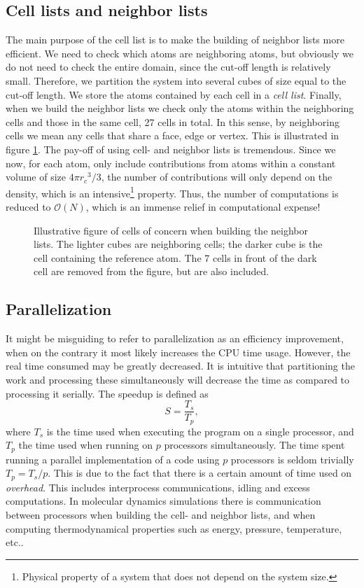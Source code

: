 \documentclass[twoside,english]{uiofysmaster}
\begin{document}
\subsection{Cell lists and neighbor lists}
The main purpose of the cell list is to make the building of neighbor lists more efficient. 
We need to check which atoms are neighboring atoms, but obviously we do not need to check the entire domain, since the cut-off length is relatively small. 
Therefore, we partition the system into several cubes of size equal to the cut-off length. 
We store the atoms contained by each cell in a \textit{cell list}. 
Finally, when we build the neighbor lists we check only the atoms within the neighboring cells and those in the same cell, 27 cells in total. 
In this sense, by neighboring cells we mean any cells that share a face, edge or vertex. 
This is illustrated in figure \ref{fig:neighbourcells}.
The pay-off of using cell- and neighbor lists is tremendous. Since we now, for each atom, only include contributions from atoms within a constant volume of size $4\pi {r_c}^3/3$, 
the number of contributions will only depend on the density, which is an intensive\footnote{Physical property of a system that does not depend on the system size.} property. 
Thus, the number of computations is reduced to $\mathcal{O} (N)$, which is an immense relief in computational expense!

\begin{figure}
	\center
	\resizebox{0.45\linewidth}{!}{
		
	}
	\caption{Illustrative figure of cells of concern when building the neighbor lists. The lighter cubes are neighboring cells; the darker cube is the cell containing the reference atom. The 7 cells in front of the dark cell are removed from the figure, but are also included. }
	\label{fig:neighbourcells}
\end{figure}




\subsection{Parallelization}
It might be misguiding to refer to parallelization as an efficiency improvement, when on the contrary it most likely increases the CPU time usage. 
However, the real time consumed may be greatly decreased. 
It is intuitive that partitioning the work and processing these simultaneously will decrease the time as compared to processing it serially.   
The speedup is defined as 
\begin{equation}
S = \frac{T_s}{T_p},
\end{equation}
where $T_s$ is the time used when executing the program on a single processor, and $T_p$ the time used when running on $p$ processors simultaneously.
The time spent running a parallel implementation of a code using $p$ processors is seldom trivially $T_p=T_s/p$. This is due to the fact that there is a certain amount of time used on \textit{overhead}. This includes interprocess communications, idling and excess computations.
In molecular dynamics simulations there is communication between processors when building the cell- and neighbor lists, and when computing thermodynamical properties such as energy, pressure, temperature, etc.. 
\end{document}
